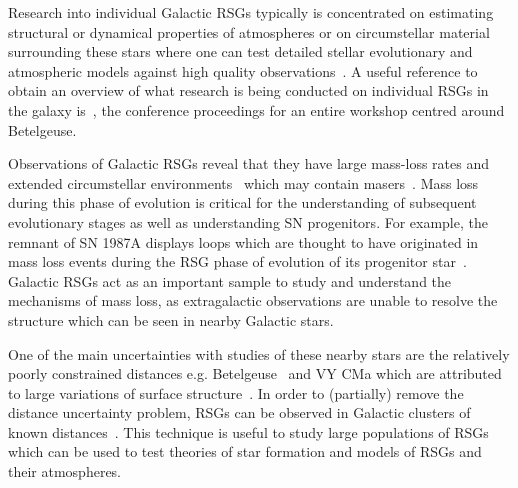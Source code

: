 {

Research into individual Galactic RSGs typically is concentrated on estimating structural or dynamical properties of atmospheres or on circumstellar material surrounding these stars where one can test detailed stellar evolutionary and atmospheric models against high quality observations~\citep[e.g.][]{2014A&A...561A..15C}.
A useful reference to obtain an overview of what research is being conducted on individual RSGs in the galaxy is~\cite{2013EAS....60.....K}, the conference proceedings for an entire workshop centred around Betelgeuse.

Observations of Galactic RSGs reveal that they have large mass-loss rates
\citep[10$^{-(6\pm 1)}$\,M$_{\odot}$\,yr$^{-1}$;][]{Danchi94, Richards13,2016AJ....151...51S} and extended circumstellar environments~\citep{Smith01,2014MNRAS.437L...1W} which may contain masers~\citep[e.g.][]{Schuster06,2012ApJ...744...23Z}.
Mass loss during this phase of evolution is critical for the understanding of subsequent evolutionary stages as well as understanding SN progenitors.
For example, the remnant of SN 1987A displays loops which are thought to have originated in mass loss events during the RSG phase of evolution of its progenitor star~\citep[][and references therein]{Humphreys13}.
Galactic RSGs act as an important sample to study and understand the mechanisms of mass loss, as extragalactic observations are unable to resolve the structure which can be seen in nearby Galactic stars.

One of the main uncertainties with studies of these nearby stars are the relatively poorly constrained distances e.g. Betelgeuse~\citep[197\,$\pm$\,45\,pc;][]{Harper08} and VY CMa
\citep[$\sim$1300\,$\pm$\,120\,pc;][]{Wittowski12,2012ApJ...744...23Z} which are attributed to large variations of surface structure~\citep{2011A&A...528A.120C}.
In order to (partially) remove the distance uncertainty problem, RSGs can be observed in Galactic clusters of known distances~\citep[e.g.][]{Humphreys78, Mel'Nik95}.
This technique is useful to study large populations of RSGs which can be used to test theories of star formation and models of RSGs and their atmospheres.


}
